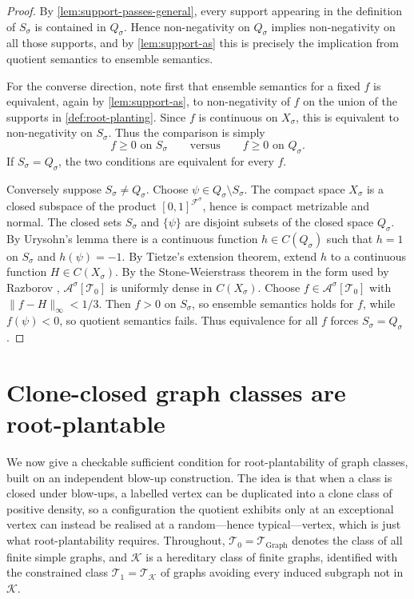 \documentclass[11pt]{article}
\theoremstyle{definition}
\newcommand{\A}{\mathcal{A}}
\newcommand{\F}{\mathcal{F}}
\newcommand{\K}{\mathcal{K}}
\newcommand{\T}{\mathcal{T}}
\begin{document}
\begin{proof}
By \cref{lem:support-passes-general}, every support appearing in the definition
of $S_\sigma$ is contained in $Q_\sigma$.  Hence non-negativity on $Q_\sigma$
implies non-negativity on all those supports, and by \cref{lem:support-as} this
is precisely the implication from quotient semantics to ensemble semantics.

For the converse direction, note first that ensemble semantics for a fixed $f$
is equivalent, again by \cref{lem:support-as}, to non-negativity of $f$ on the
union of the supports in \cref{def:root-planting}.  Since $f$ is continuous on
$X_\sigma$, this is equivalent to non-negativity on $S_\sigma$.
Thus the comparison is simply
\[
  f\ge0\text{ on }S_\sigma
  \qquad\text{versus}\qquad
  f\ge0\text{ on }Q_\sigma.
\]
If $S_\sigma=Q_\sigma$, the two conditions are equivalent for every $f$.

Conversely suppose $S_\sigma\ne Q_\sigma$.  Choose
$\psi\in Q_\sigma\setminus S_\sigma$.  The compact space $X_\sigma$ is a closed subspace of the product
$[0,1]^{\F^\sigma}$, hence is compact metrizable and normal.  The closed sets
$S_\sigma$ and $\{\psi\}$ are disjoint subsets of the closed space $Q_\sigma$.
By Urysohn's lemma there is a continuous function $h\in C(Q_\sigma)$ such that
$h=1$ on $S_\sigma$ and $h(\psi)=-1$.  By Tietze's extension theorem, extend
$h$ to a continuous function $H\in C(X_\sigma)$.  By the Stone-Weierstrass
theorem in the form used by Razborov \cite[Proposition 3.7]{Razborov2007},
$\A^\sigma[\T_0]$ is uniformly dense in $C(X_\sigma)$.  Choose
$f\in\A^\sigma[\T_0]$ with $\|f-H\|_\infty<1/3$.  Then $f>0$ on
$S_\sigma$, so ensemble semantics holds for $f$, while $f(\psi)<0$, so quotient
semantics fails.  Thus equivalence for all $f$ forces $S_\sigma=Q_\sigma$.
\end{proof}

\section{Clone-closed graph classes are root-plantable}

We now give a checkable sufficient condition for root-plantability of graph
classes, built on an independent blow-up construction.  The idea is that when a class is
closed under blow-ups, a labelled vertex can be duplicated into a clone class of
positive density, so a configuration the quotient exhibits only at an exceptional vertex
can instead be realised at a random---hence typical---vertex, which is just what
root-plantability requires.  Throughout, $\T_0=\T_{\mathrm{Graph}}$ denotes the class of
all finite simple graphs, and $\K$ is a hereditary class of finite graphs, identified with
the constrained class $\T_1=\T_\K$ of graphs avoiding every induced subgraph not in $\K$.
\end{document}

